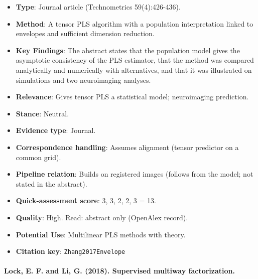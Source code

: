 \documentclass[journal,onecolumn]{IEEEtran}
\begin{document}
\begin{itemize}

\item{} \textbf{Type}: Journal article (Technometrics 59(4):426-436).

\item{} \textbf{Method}: A tensor PLS algorithm with a population interpretation linked to envelopes and sufficient dimension reduction.

\item{} \textbf{Key Findings}: The abstract states that the population model gives the asymptotic consistency of the PLS estimator, that the method was compared analytically and numerically with alternatives, and that it was illustrated on simulations and two neuroimaging analyses.

\item{} \textbf{Relevance}: Gives tensor PLS a statistical model; neuroimaging prediction.

\item{} \textbf{Stance}: Neutral.

\item{} \textbf{Evidence type}: Journal.

\item{} \textbf{Correspondence handling}: Assumes alignment (tensor predictor on a common grid).

\item{} \textbf{Pipeline relation}: Builds on registered images (follows from the model; not stated in the abstract).

\item{} \textbf{Quick-assessment score}: 3, 3, 2, 2, 3 = 13.

\item{} \textbf{Quality}: High. Read: abstract only (OpenAlex record).

\item{} \textbf{Potential Use}: Multilinear PLS methods with theory.

\item{} \textbf{Citation key}: \texttt{Zhang2017Envelope}

\end{itemize}

\paragraph{Lock, E. F. and Li, G. (2018). Supervised multiway factorization.~\cite{Lock2018Supervised}}\mbox{}
\end{document}
